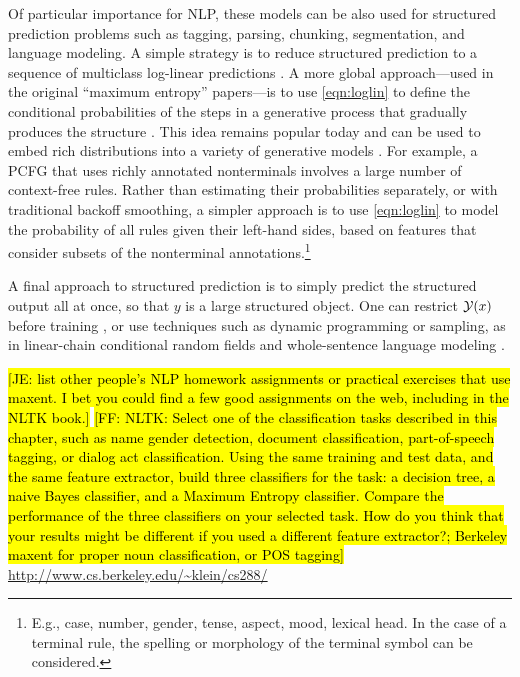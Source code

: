 \documentclass[11pt,letterpaper]{article}
\newcommand{\Note}[1]{}
\renewcommand{\Note}[1]{\hl{[#1]}}  %
\newcommand{\NoteSigned}[3]{{\sethlcolor{#2}\Note{#1: #3}}}
\newcommand{\NoteFF}[1]{\NoteSigned{FF}{LightBlue}{#1}}
\newcommand{\NoteJE}[1]{\NoteSigned{JE}{LightGreen}{#1}}
\begin{document}
Of particular importance for NLP, these models can be also used for
structured prediction problems such as tagging, parsing, chunking,
segmentation, and language modeling.  A simple strategy is to reduce
structured prediction to a sequence of multiclass log-linear
predictions \cite{ratnaparkhi-1998}.  A more global approach---used in
the original ``maximum entropy'' papers---is to use \eqref{eqn:loglin}
to define the conditional probabilities of the steps in a generative
process that gradually produces the structure
\cite{rosenfeld-1994,berger-dellapietra-dellapietra-1996}.  This idea
remains popular today and can be used to embed rich distributions
into a variety of generative models \cite{bergkirkpatrick-et-al-2010}.
For example, a PCFG that uses richly annotated nonterminals involves a
large number of context-free rules.  Rather than estimating their
probabilities separately, or with traditional backoff smoothing, a
simpler approach is to use \eqref{eqn:loglin} to model the probability
of all rules given their left-hand sides, based on features that
consider subsets of the nonterminal annotations.\footnote{E.g., case,
  number, gender, tense, aspect, mood, lexical head.  In the case of a
  terminal rule, the spelling or morphology of the terminal symbol can
  be considered.}  

A final approach to structured prediction is to
simply predict the structured output all at once, so that $y$ is a
large structured object. One can restrict ${\cal Y}(x)$ before training
\cite{johnson-et-al-1999}, or use techniques such as dynamic
programming or sampling, as in linear-chain conditional random fields
\cite{lafferty-mccallum-pereira-2001} and whole-sentence language
modeling \cite{rosenfeld-chen-zhu-2001}. 

\NoteJE{list
  other people's NLP homework assignments or practical exercises that
  use maxent.  I bet you could find a few good assignments on the web,
  including in the NLTK book.}
\NoteFF{NLTK: Select one of the classification tasks described in this chapter, such as name gender detection, document classification, part-of-speech tagging, or dialog act classification. Using the same training and test data, and the same feature extractor, build three classifiers for the task: a decision tree, a naive Bayes classifier, and a Maximum Entropy classifier. Compare the performance of the three classifiers on your selected task. How do you think that your results might be different if you used a different feature extractor?; Berkeley  maxent for proper noun classification, or POS tagging} \url{http://www.cs.berkeley.edu/~klein/cs288/}
\end{document}
